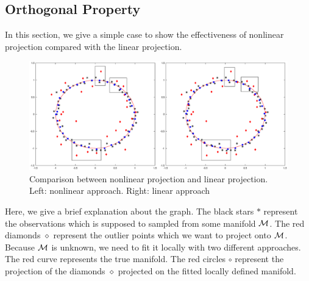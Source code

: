 \documentclass[aos,preprint]{imsart}
\theoremstyle{remark}
\begin{document}
\subsection{Orthogonal Property}
In this section, we give a simple case to show the effectiveness of nonlinear projection compared with the linear projection.
\begin{figure}[h] %
   \centering
   \includegraphics[width=0.7\linewidth]{compare_linear_nonliear.eps} 
   \caption{Comparison between nonlinear projection and linear projection. Left: nonlinear approach. Right: linear approach}
   \label{fig:example}
\end{figure}

Here, we give a brief explanation about the graph. The black stars $*$ represent the observations which is supposed to sampled from some manifold $\cal M$. The red diamonds $\diamond$ represent the outlier points which we want to project onto $\cal M$. Because $\cal M$ is unknown, we need to fit it locally with two different approaches. The red curve represents the true manifold. The red circles $\circ$ represent the projection of the diamonds $\diamond$ projected on the fitted locally defined manifold.
\end{document}
